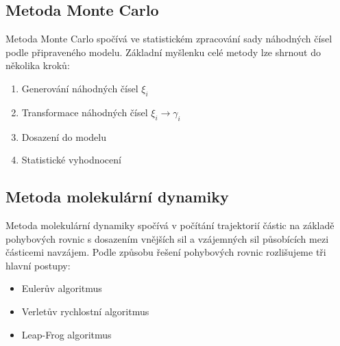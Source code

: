 \begin{question}[name={Metoda Monte Carlo, metoda molekulární dynamiky},authors={Zdeněk Turek}]
	
	\subsection{Metoda Monte Carlo}
	
	Metoda Monte Carlo spočívá ve statistickém zpracování sady náhodných čísel podle připraveného modelu. Základní myšlenku celé metody lze shrnout do několika kroků:
	\begin{enumerate}
		\item Generování náhodných čísel $\xi_i$
		\item Transformace náhodných čísel $\xi_i \rightarrow \gamma_i$
		\item Dosazení do modelu
		\item Statistické vyhodnocení
	\end{enumerate}
	
	\subsection{Metoda molekulární dynamiky}
	
	Metoda molekulární dynamiky spočívá v počítání trajektorií částic na základě pohybových rovnic s dosazením vnějších sil a vzájemných sil působících mezi částicemi navzájem. Podle způsobu řešení pohybových rovnic rozlišujeme tři hlavní postupy:
	\begin{itemize}
		\item Eulerův algoritmus
		\item Verletův rychlostní algoritmus
		\item Leap-Frog algoritmus
	\end{itemize}
	
\end{question}